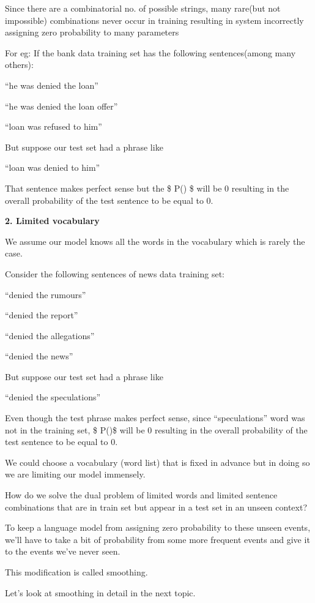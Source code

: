 \documentclass[11pt]{article}
\begin{document}
Since there are a combinatorial no. of possible strings, many rare(but
not impossible) combinations never occur in training resulting in system
incorrectly assigning zero probability to many parameters

For eg: If the bank data training set has the following sentences(among
many others):

``he was denied the loan''

``he was denied the loan offer''

``loan was refused to him''

But suppose our test set had a phrase like

``loan was denied to him''

That sentence makes perfect sense but the \$ P() \$
will be 0 resulting in the overall probability of the test sentence to
be equal to 0.

\textbf{2. Limited vocabulary}

We assume our model knows all the words in the vocabulary which is
rarely the case.

Consider the following sentences of news data training set:

``denied the rumours''

``denied the report''

``denied the allegations''

``denied the news''

But suppose our test set had a phrase like

``denied the speculations''

Even though the test phrase makes perfect sense, since ``speculations''
word was not in the training set, \$ P()\$ will
be 0 resulting in the overall probability of the test sentence to be
equal to 0.

We could choose a vocabulary (word list) that is fixed in advance but in
doing so we are limiting our model immensely.

How do we solve the dual problem of limited words and limited sentence
combinations that are in train set but appear in a test set in an unseen
context?

To keep a language model from assigning zero probability to these unseen
events, we'll have to take a bit of probability from some more frequent
events and give it to the events we've never seen.

This modification is called smoothing.

Let's look at smoothing in detail in the next topic.
\end{document}

